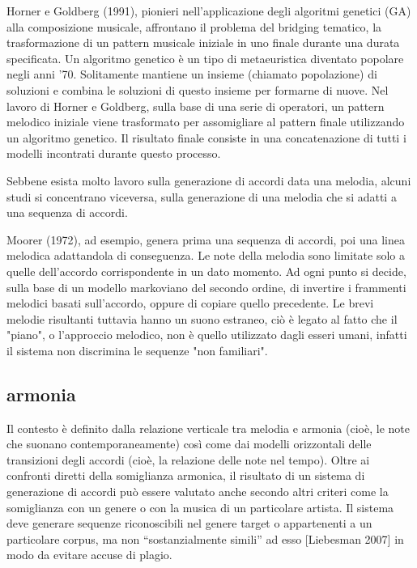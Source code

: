 \documentclass[a4paper,12pt]{report}
\begin{document}
Horner e Goldberg (1991), pionieri nell'applicazione degli algoritmi genetici (GA) alla composizione musicale, affrontano il problema del bridging tematico, la trasformazione di un pattern musicale iniziale in uno finale durante una durata specificata. 
Un algoritmo genetico è un tipo di metaeuristica diventato popolare negli anni '70. 
Solitamente mantiene un insieme (chiamato popolazione) di soluzioni e combina le soluzioni di questo insieme per formarne di nuove. 
Nel lavoro di Horner e Goldberg, sulla base di una serie di operatori, un pattern melodico iniziale viene trasformato per assomigliare al pattern finale utilizzando un algoritmo genetico. 
Il risultato finale consiste in una concatenazione di tutti i modelli incontrati durante questo processo.

Sebbene esista molto lavoro sulla generazione di accordi data una melodia, alcuni studi si concentrano viceversa, sulla generazione di una melodia che si adatti a una sequenza di accordi.

Moorer (1972), ad esempio, genera prima una sequenza di accordi, poi una linea melodica adattandola di conseguenza.
Le note della melodia sono limitate solo a quelle dell'accordo corrispondente in un dato momento. 
Ad ogni punto si decide, sulla base di un modello markoviano del secondo ordine, di invertire i frammenti melodici basati sull'accordo, oppure di copiare quello precedente.
Le brevi melodie risultanti tuttavia hanno un suono estraneo, ciò è legato al fatto che il "piano", o l'approccio melodico, non è quello utilizzato dagli esseri umani, infatti il sistema non discrimina le sequenze "non familiari".


\subsection{armonia}

Il contesto è definito dalla relazione verticale tra melodia e armonia (cioè, le note che suonano contemporaneamente) così come dai modelli orizzontali delle transizioni degli accordi (cioè, la relazione delle note nel tempo).
Oltre ai confronti diretti della somiglianza armonica, il risultato di un sistema di generazione di accordi può essere valutato anche secondo altri criteri come la somiglianza con un genere o con la musica di un particolare artista.
Il sistema deve generare sequenze riconoscibili nel genere target o appartenenti a un particolare corpus, ma non “sostanzialmente simili” ad esso [Liebesman 2007] in modo da evitare accuse di plagio.
\end{document}
